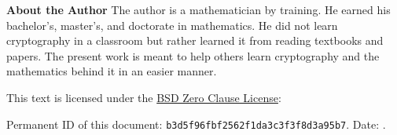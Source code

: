 \noindent
\textbf{About the Author}
The author is a mathematician by training.
He earned his bachelor's, master's, and doctorate in mathematics.
He did not learn cryptography in a classroom but rather
learned it from reading textbooks and papers.
The present work is meant to help others learn cryptography
and the mathematics behind it in an easier manner.

\vfill

\noindent
This text is licensed under the
\href{https://spdx.org/licenses/0BSD.html}{BSD Zero Clause License}:


\noindent
Permanent ID of this document:
\texttt{b3d5f96fbf2562f1da3c3f3f8d3a95b7}.
Date: {\DTMtoday}.

\thispagestyle{plain}
\clearpage
